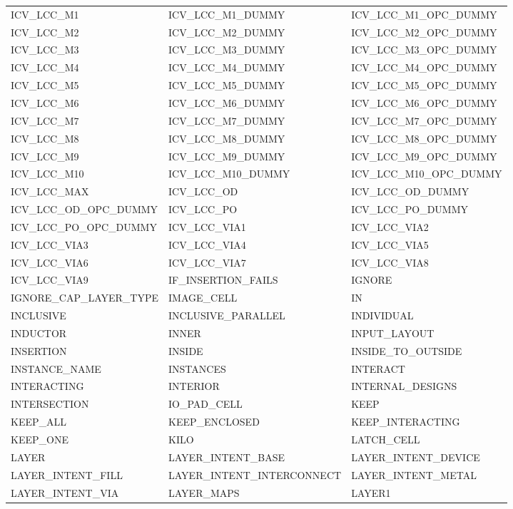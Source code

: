 \begin{longtable}{@{}>{\raggedright\arraybackslash\ttfamily}p{} >{\raggedright\arraybackslash\ttfamily}p{} >{\raggedright\arraybackslash\ttfamily}p{}@{}}
ICV\_LCC\_M1 & ICV\_LCC\_M1\_DUMMY & ICV\_LCC\_M1\_OPC\_DUMMY \\
ICV\_LCC\_M2 & ICV\_LCC\_M2\_DUMMY & ICV\_LCC\_M2\_OPC\_DUMMY \\
ICV\_LCC\_M3 & ICV\_LCC\_M3\_DUMMY & ICV\_LCC\_M3\_OPC\_DUMMY \\
ICV\_LCC\_M4 & ICV\_LCC\_M4\_DUMMY & ICV\_LCC\_M4\_OPC\_DUMMY \\
ICV\_LCC\_M5 & ICV\_LCC\_M5\_DUMMY & ICV\_LCC\_M5\_OPC\_DUMMY \\
ICV\_LCC\_M6 & ICV\_LCC\_M6\_DUMMY & ICV\_LCC\_M6\_OPC\_DUMMY \\
ICV\_LCC\_M7 & ICV\_LCC\_M7\_DUMMY & ICV\_LCC\_M7\_OPC\_DUMMY \\
ICV\_LCC\_M8 & ICV\_LCC\_M8\_DUMMY & ICV\_LCC\_M8\_OPC\_DUMMY \\
ICV\_LCC\_M9 & ICV\_LCC\_M9\_DUMMY & ICV\_LCC\_M9\_OPC\_DUMMY \\
ICV\_LCC\_M10 & ICV\_LCC\_M10\_DUMMY & ICV\_LCC\_M10\_OPC\_DUMMY \\
ICV\_LCC\_MAX & ICV\_LCC\_OD & ICV\_LCC\_OD\_DUMMY \\
ICV\_LCC\_OD\_OPC\_DUMMY & ICV\_LCC\_PO & ICV\_LCC\_PO\_DUMMY \\
ICV\_LCC\_PO\_OPC\_DUMMY & ICV\_LCC\_VIA1 & ICV\_LCC\_VIA2 \\
ICV\_LCC\_VIA3 & ICV\_LCC\_VIA4 & ICV\_LCC\_VIA5 \\
ICV\_LCC\_VIA6 & ICV\_LCC\_VIA7 & ICV\_LCC\_VIA8 \\
ICV\_LCC\_VIA9 & IF\_INSERTION\_FAILS & IGNORE \\
IGNORE\_CAP\_LAYER\_TYPE & IMAGE\_CELL & IN \\
INCLUSIVE & INCLUSIVE\_PARALLEL & INDIVIDUAL \\
INDUCTOR & INNER & INPUT\_LAYOUT \\
INSERTION & INSIDE & INSIDE\_TO\_OUTSIDE \\
INSTANCE\_NAME & INSTANCES & INTERACT \\
INTERACTING & INTERIOR & INTERNAL\_DESIGNS \\
INTERSECTION & IO\_PAD\_CELL & KEEP \\
KEEP\_ALL & KEEP\_ENCLOSED & KEEP\_INTERACTING \\
KEEP\_ONE & KILO & LATCH\_CELL \\
LAYER & LAYER\_INTENT\_BASE & LAYER\_INTENT\_DEVICE \\
LAYER\_INTENT\_FILL & LAYER\_INTENT\_INTERCONNECT & LAYER\_INTENT\_METAL \\
LAYER\_INTENT\_VIA & LAYER\_MAPS & LAYER1 \\

\end{longtable}

